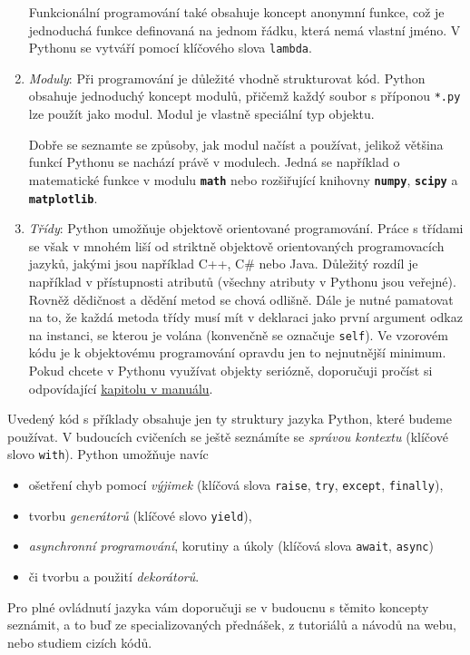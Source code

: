 \documentclass[a4paper,11pt,twoside]{article}
\def\code#1{\textnormal{\texttt{#1}}}
\def\file#1{\textnormal{\textbf{\texttt{#1}}}}
\theoremstyle{red}
\theoremstyle{green}
\begin{document}
\begin{enumerate}
            Funkcionální programování také obsahuje koncept anonymní funkce, což je jednoduchá funkce definovaná na jednom řádku, která nemá vlastní jméno.
            V Pythonu se vytváří pomocí klíčového slova \code{lambda}.

        \item 
            \emph{Moduly}: Při programování je důležité vhodně strukturovat kód.
            Python obsahuje jednoduchý koncept modulů, přičemž každý soubor s příponou \code{*.py} lze použít jako modul.
            Modul je vlastně speciální typ objektu.

            Dobře se seznamte se způsoby, jak modul načíst a používat, jelikož většina funkcí Pythonu se nachází právě v modulech.
            Jedná se například o matematické funkce v modulu \file{math} nebo rozšiřující knihovny \file{numpy}, \file{scipy} a \file{matplotlib}.

        \item 
            \emph{Třídy}: Python umožňuje objektově orientované programování.
            Práce s třídami se však v mnohém liší od striktně objektově orientovaných programovacích jazyků, jakými jsou například C++, C\# nebo Java.
            Důležitý rozdíl je například v přístupnosti atributů (všechny atributy v Pythonu jsou veřejné).
            Rovněž dědičnost a dědění metod se chová odlišně.
            Dále je nutné pamatovat na to, že každá metoda třídy musí mít v deklaraci jako první argument odkaz na instanci, se kterou je volána (konvenčně se označuje \code{self}).
            Ve vzorovém kódu je k objektovému programování opravdu jen to nejnutnější minimum.
            Pokud chcete v Pythonu využívat objekty seriózně, doporučuji pročíst si odpovídající \href{https://docs.python.org/3/tutorial/classes.html}{kapitolu v manuálu}.
    \end{enumerate}

    Uvedený kód s příklady obsahuje jen ty struktury jazyka Python, které budeme používat.
    V budoucích cvičeních se ještě seznámíte se \emph{správou kontextu} (klíčové slovo \code{with}).
    Python umožňuje navíc 
    \begin{itemize}
        \item ošetření chyb pomocí \emph{výjimek} (klíčová slova \code{raise}, \code{try}, \code{except}, \code{finally}),
        \item tvorbu \emph{generátorů} (klíčové slovo \code{yield}),
        \item \emph{asynchronní programování}, korutiny a úkoly (klíčová slova \code{await}, \code{async})
        \item či tvorbu a použití \emph{dekorátorů}.
    \end{itemize}
    Pro plné ovládnutí jazyka vám doporučuji se v budoucnu s těmito koncepty seznámit, a to buď ze specializovaných přednášek, z tutoriálů a návodů na webu, nebo studiem cizích kódů.
\end{document}
